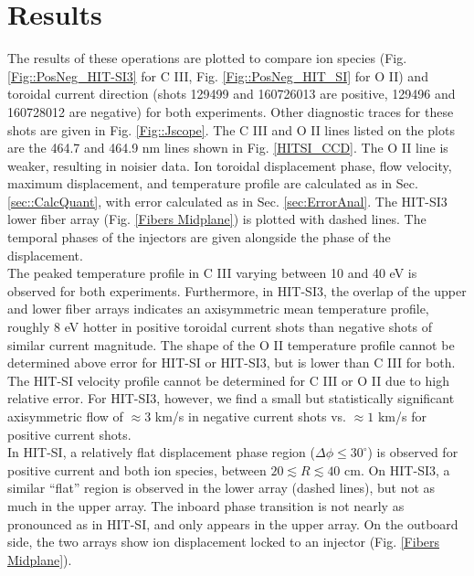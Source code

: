 	\section{Results}
	\hspace{4ex}The results of these operations are plotted to compare ion species (Fig. \ref{Fig::PosNeg_HIT-SI3} for C III,  Fig. \ref{Fig::PosNeg_HIT_SI} for O II) and toroidal current direction (shots 129499 and 160726013 are positive, 129496 and 160728012 are negative) for both experiments. Other diagnostic traces for these shots are given in Fig. \ref{Fig::Jscope}. The C III and O II lines listed on the plots are the 464.7 and 464.9 nm lines shown in Fig. \ref{HITSI_CCD}. The O II line is weaker, resulting in noisier data. Ion toroidal displacement phase, flow velocity, maximum displacement, and temperature profile are calculated as in Sec. \ref{sec::CalcQuant}, with error calculated as in Sec. \ref{sec:ErrorAnal}. The HIT-SI3 lower fiber array (Fig. \ref{Fibers Midplane}) is plotted with dashed lines. The temporal phases of the injectors are given alongside the phase of the displacement.\\
	\hspace*{4ex}The peaked temperature profile in C III varying between 10 and 40 eV  is observed for both experiments. Furthermore, in HIT-SI3, the overlap of the upper and lower fiber arrays indicates an axisymmetric mean temperature profile, roughly 8 eV hotter in positive toroidal current shots than negative shots of similar current magnitude. The shape of the O II temperature profile cannot be determined above error for HIT-SI or HIT-SI3, but is lower than C III for both.\\
	\hspace*{4ex}The HIT-SI velocity profile cannot be determined for C III or O II due to high relative error. For HIT-SI3, however, we find a small but statistically significant axisymmetric flow of $\approx3$ km/s in negative current shots vs. $\approx1$ km/s for  positive current shots.\\
	\hspace*{4ex}In HIT-SI, a relatively flat displacement phase region ($\Delta\phi\leq30^\circ$) is observed for positive current and both ion species, between $20\lesssim{R}\lesssim40$ cm. On HIT-SI3, a similar ``flat'' region is observed in the lower array (dashed lines), but not as much in the upper array. The inboard phase transition is not nearly as pronounced as in HIT-SI, and only appears in the upper array. On the outboard side, the two arrays show ion displacement locked to an injector (Fig. \ref{Fibers Midplane}).
	
